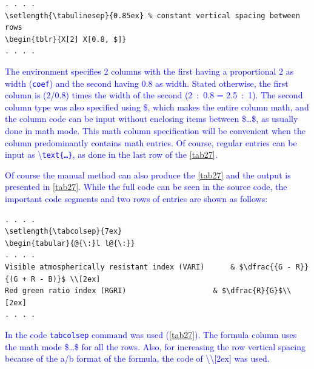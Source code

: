 \documentclass[phd,showframe]{ndsu-thesis-2022}
\newcommand\italk[1]{\textcolor{blue}{#1}}  %
\newcommand\cmd[1]{\textbackslash\texttt{#1}}  %
\newcommand\vb[1]{\textcolor{blue}{\texttt{#1}}}%
\begin{document}
\vspace{-1ex}
{\singlespacing
\begin{verbatim}
. . . . 
\setlength{\tabulinesep}{0.85ex} % constant vertical spacing between rows
\begin{tblr}{X[2] X[0.8, $]}
. . . . 
\end{verbatim}
}

\vspace{-2ex}
\italk{The environment specifies 2 columns with the first having a proportional 2 as width (\vb{coef}) and the second having 0.8 as width. Stated otherwise, the first column is \fpeval{2/0.8} (2/0.8) times the width of the second (2~:~0.8 = 2.5~:~1). The second column type was also specified using \$, which makes the entire column math, and the column code can be input without enclosing items between \$\ldots\$, as usually done in math mode. This math column specification will be convenient when the column predominantly contains math entries. Of course, regular entries can be input as \cmd{text\{\ldots\}}, as done in the last row of the \cref{tab27}.
}

\italk{Of course the manual method can also produce the \cref{tab27} and the output is presented in \cref{tab27}.  While the full code can be seen in the source code, the important code segments and two rows of entries are shown as follows:
}

{\singlespacing
\begin{verbatim}
. . . . 
\setlength{\tabcolsep}{7ex}
\begin{tabular}{@{\:}l l@{\:}}
. . . . 
Visible atmospherically resistant index (VARI) 		& $\dfrac{{G - R}}
{(G + R - B)}$ \\[2ex]
Red green ratio index (RGRI) 					& $\dfrac{R}{G}$\\[2ex]
. . . . 
\end{verbatim}
}

\vspace{-2ex}
\italk{In the code \vb{tabcolsep} command was used (\cref{tab27}). The formula column uses the math mode \$\ldots\$ for all the rows. Also, for increasing the row vertical spacing because of the a/b format of the formula, the code of \textbackslash\textbackslash[2ex] was used.}
\end{document}
